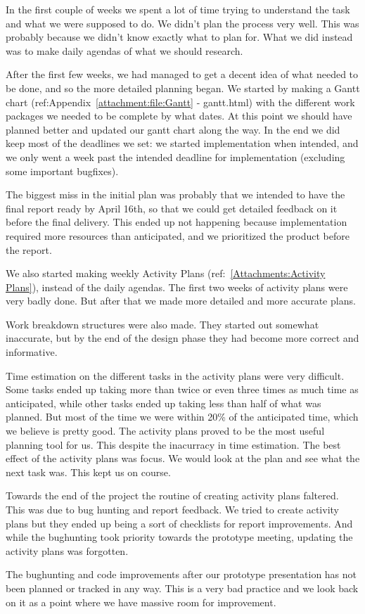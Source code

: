 In the first couple of weeks we spent a lot of time trying to understand the task and what we were supposed to do. We didn't plan the process very well. This was probably because we didn't know exactly what to plan for. What we did instead was to make daily agendas of what we should research.

After the first few weeks, we had managed to get a decent idea of what needed to be done, and so the more detailed planning began. We started by making a Gantt chart (ref:Appendix~\ref{attachment:file:Gantt} - gantt.html) with the different work packages we needed to be complete by what dates. At this point we should have planned better and updated our gantt chart along the way. In the end we did keep most of the deadlines we set: we started implementation when intended, and we only went a week past the intended deadline for implementation (excluding some important bugfixes). 

The biggest miss in the initial plan was probably that we intended to have the final report ready by April 16th, so that we could get detailed feedback on it before the final delivery. This ended up not happening because implementation required more resources than anticipated, and we prioritized the product before the report.

We also started making weekly Activity Plans (ref:~\ref{Attachments:Activity Plans}), instead of the daily agendas. The first two weeks of activity plans were very badly done. But after that we made more detailed and more accurate plans.

Work breakdown structures were also made. They started out somewhat inaccurate, but by the end of the design phase they had become more correct and informative. 

Time estimation on the different tasks in the activity plans were very difficult. Some tasks ended up taking more than twice or even three times as much time as anticipated, while other tasks ended up taking less than half of what was planned. But most of the time we were within 20\% of the anticipated time, which we believe is pretty good. The activity plans proved to be the most useful planning tool for us. This despite the inacurracy in time estimation. The best effect of the activity plans was focus. We would look at the plan and see what the next task was. This kept us on course. 

Towards the end of the project the routine of creating activity plans faltered. This was due to bug hunting and report feedback. We tried to create activity plans but they ended up being a sort of checklists for report improvements. And while the bughunting took priority towards the prototype meeting, updating the activity plans was forgotten.
    
The bughunting and code improvements after our prototype presentation has not been planned or tracked in any way. This is a very bad practice and we look back on it as a point where we have massive room for improvement.

